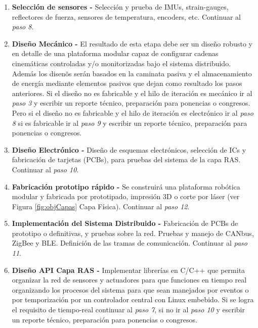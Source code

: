 \begin{enumerate}
\item \textbf{Selecci\'on de sensores - } Selecci\'on y prueba de IMUs, strain-gauges, reflectores de fuerza, sensores de temperatura, encoders, etc. Continuar al \emph{paso 8}.\par
\item \textbf{Dise\~no Mec\'anico - } El resultado de esta etapa debe ser un dise\~no robusto y en detalle de una plataforma modular capaz de configurar cadenas cinem\'aticas controladas y/o monitorizadas bajo el sistema distribuido. Adem\'as los disen\~os ser\'an basados en la caminata pasiva y el almacenamiento de energ\'ia mediante elementos pasivos que dejan como resultado los pasos anteriores. Si el dise\~no no es fabricable y el hilo de iteraci\'on es mec\'anico ir al \emph{paso 3} y escribir un reporte t\'ecnico, preparaci\'on para ponencias o congresos. Pero si el dise\~no no es fabricable y el hilo de iteraci\'on es electr\'onico ir al \emph{paso 8} si es fabricable ir al \emph{paso 9} y escribir un reporte t\'ecnico, preparaci\'on para ponencias o congresos.\par
\item \textbf{Dise\~no Electr\'onico - } Dise\~no de esquemas electrónicos, selección de ICs y fabricaci\'on de tarjetas (PCBs), para pruebas del sistema de la capa RAS. Continuar al \emph{paso 10}.\par
\item \textbf{Fabricaci\'on prototipo r\'apido - } Se construir\'a una plataforma rob\'otica modular y fabricada por prototipado, impresión 3D o corte por láser (ver Figura \ref{fig:objCapas} Capa Física). Continuar al \emph{paso 12}.\par
\item \textbf{Implementaci\'on del Sistema Distribuido - } Fabricaci\'on de PCBs de prototipo o definitivas, y pruebas sobre la red. Pruebas y manejo de CANbus, ZigBee y BLE. Definición de las tramas de comunicaci\'on. Continuar al \emph{paso 11}.\par
\item \textbf{Dise\~no API Capa RAS - } Implementar librerías en C/C++ que permita organizar la red de sensores y actuadores para que funciones en tiempo real organizando los procesos del sistema para que sean manejados por eventos o por temporizaci\'on por un controlador central con Linux embebido. Si se logra el requisito de tiempo-real continuar al \emph{paso 7}, si no ir al \emph{paso 10} y escribir un reporte t\'ecnico, preparaci\'on para ponencias o congresos.\par

\end{enumerate}
